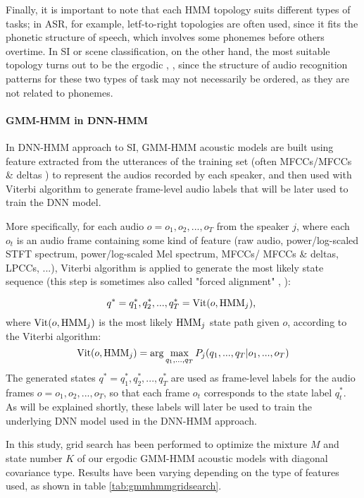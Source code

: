 Finally, it is important to note that each HMM topology suits different types of tasks; in ASR, for example, letf-to-right topologies are often used, since it fits the phonetic structure of speech, which involves some phonemes before others overtime. In SI or scene classification, on the other hand, the most suitable topology turns out to be the ergodic \cite{si:dnnhmm}, \cite{dnnhmmscene}, since the structure of audio recognition patterns for these two types of task may not necessarily be ordered, as they are not related to phonemes.

\paragraph{GMM-HMM in DNN-HMM}
In DNN-HMM approach to SI, GMM-HMM acoustic models are built using feature extracted from the utterances of the training set (often MFCCs/MFCCs \& deltas \cite{si:dnnhmm}) to represent the audios recorded by each speaker, and then used with Viterbi algorithm to generate frame-level audio labels that will be later used to train the DNN model.

More specifically, for each audio $o = o_1, o_2, ..., o_T$ from the speaker $j$, where each $o_t$ is an audio frame containing some kind of feature (raw audio, power/log-scaled STFT spectrum, power/log-scaled Mel spectrum, MFCCs/ MFCCs \& deltas, LPCCs, ...), Viterbi algorithm is applied to generate the most likely state sequence (this step is sometimes also called "forced alignment" \cite{si:dnnhmm}, \cite{dnnhmmscene}):

$$q^* = q^*_1, q^*_2, ..., q^*_T = \operatorname{Vit}(o, \operatorname{HMM}_j) \text{, }$$
where $\operatorname{Vit}(o, \operatorname{HMM}_j)$ is the most likely $\operatorname{HMM}_j$ state path given $o$, according to the Viterbi algorithm:
$$\operatorname{Vit}(o, \operatorname{HMM}_j) = \arg \max_{q_1, ..., q_T} P_j(q_1, ..., q_T | o_1, ..., o_T)$$
The generated states $q^* = q^*_1, q^*_2, ..., q^*_T$ are used as frame-level labels for the audio frames $o = o_1, o_2, ..., o_T$, so that each frame $o_t$ corresponds to the state label $q^*_t$. 
\\As will be explained shortly, these labels will later be used to train the underlying DNN model used in the DNN-HMM approach.

In this study, grid search has been performed to optimize the mixture $M$ and state number $K$ of our ergodic GMM-HMM acoustic models with diagonal covariance type. Results have been varying depending on the type of features used, as shown in table \vref{tab:gmmhmmgridsearch}.

